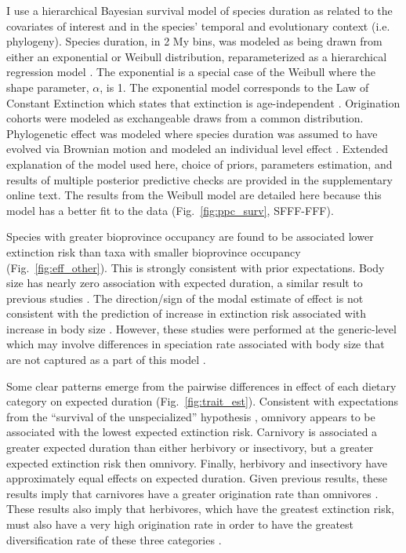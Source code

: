 \documentclass[12pt]{article}
\begin{document}
I use a hierarchical Bayesian survival model of species duration as related to the covariates of interest and in the species' temporal and evolutionary context (i.e. phylogeny). Species duration, in 2 My bins, was modeled as being drawn from either an exponential or Weibull distribution, reparameterized as a hierarchical regression model \cite{Gelman2013d}. The exponential is a special case of the Weibull where the shape parameter, $\alpha$, is 1. The exponential model corresponds to the Law of Constant Extinction which states that extinction is age-independent \cite{VanValen1973}. Origination cohorts were modeled as exchangeable draws from a common distribution. Phylogenetic effect was modeled where species duration was assumed to have evolved via Brownian motion and modeled an individual level effect \cite{Housworth2004}. Extended explanation of the model used here, choice of priors, parameters estimation, and results of multiple posterior predictive checks are provided in the supplementary online text. The results from the Weibull model are detailed here because this model has a better fit to the data (Fig.~\ref{fig:ppc_surv}, SFFF-FFF).

Species with greater bioprovince occupancy are found to be associated lower extinction risk than taxa with smaller bioprovince occupancy (Fig.~\ref{fig:eff_other}). This is strongly consistent with prior expectations. Body size has nearly zero association with expected duration, a similar result to previous studies \cite{Tomiya2013}. The direction/sign of the modal estimate of effect is not consistent with the prediction of increase in extinction risk associated with increase in body size \cite{Liow2008}. However, these studies were performed at the generic-level which may involve differences in speciation rate associated with body size that are not captured as a part of this model \cite{Tomiya2013,Liow2008}.

Some clear patterns emerge from the pairwise differences in effect of each dietary category on expected duration (Fig.~\ref{fig:trait_est}). Consistent with expectations from the ``survival of the unspecialized'' hypothesis \cite{Liow2004a,Simpson1944}, omnivory appears to be associated with the lowest expected extinction risk. Carnivory is associated a greater expected duration than either herbivory or insectivory, but a greater expected extinction risk then omnivory. Finally, herbivory and insectivory have approximately equal effects on expected duration. Given previous results, these results imply that carnivores have a greater origination rate than omnivores \cite{Price2012}. These results also imply that herbivores, which have the greatest extinction risk, must also have a very high origination rate in order to have the greatest diversification rate of these three categories \cite{Price2012}. 
\end{document}
